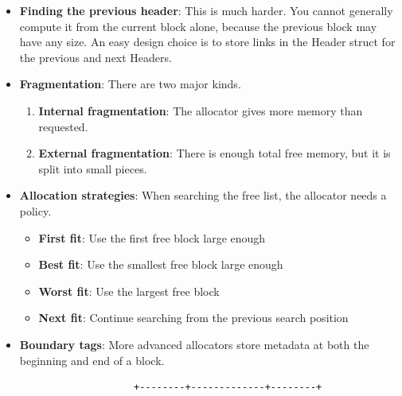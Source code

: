 \documentclass{report}
\begin{document}
\begin{itemize}
                \bigbreak \noindent 
                If we track the position of the program break, then we can check that a header exists at that location if it is less than the program break.
                \bigbreak \noindent 
                \begin{cppcode}
                    char* next_address = (char*)block + HEADER_ALIGN + block->size;
                    if (next_address >= program_break) {
                        // no header exists at this location.
                    }
                \end{cppcode}
            \item \textbf{Finding the previous header}: This is much harder. You cannot generally compute it from the current block alone, because the previous block may have any size.
                \bigbreak \noindent 
                An easy design choice is to store links in the Header struct for the previous and next Headers.
            \item \textbf{Fragmentation}: There are two major kinds.
                \begin{enumerate}
                    \item \textbf{Internal fragmentation}: The allocator gives more memory than requested.
                    \item \textbf{External fragmentation}: There is enough total free memory, but it is split into small pieces.
                \end{enumerate}
            \item \textbf{Allocation strategies}: When searching the free list, the allocator needs a policy.
                \begin{itemize}
                    \item \textbf{First fit}:	Use the first free block large enough
                    \item \textbf{Best fit}:	Use the smallest free block large enough
                    \item \textbf{Worst fit}:	Use the largest free block
                    \item \textbf{Next fit}:	Continue searching from the previous search position
                \end{itemize}
            \item \textbf{Boundary tags}: More advanced allocators store metadata at both the beginning and end of a block.
                \begin{verbatim}
                    +--------+-------------+--------+

\end{verbatim}
\end{itemize}
\end{document}
